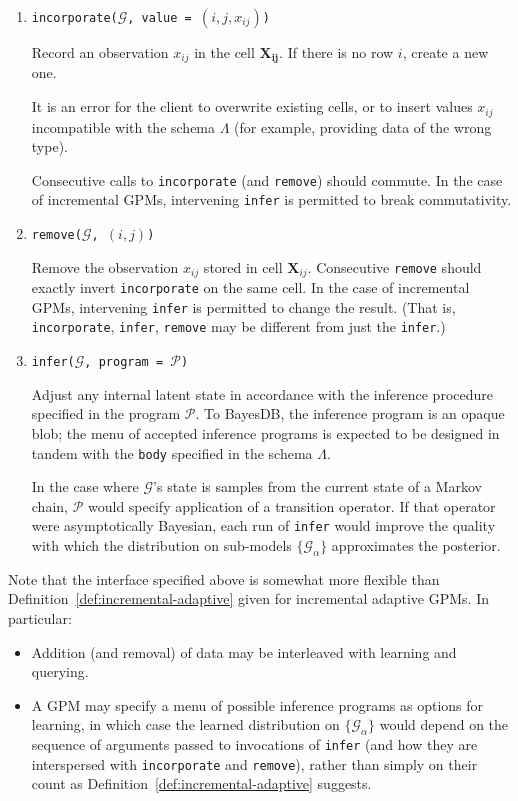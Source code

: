 \documentclass[10pt,letterpaper]{article}
\newcommand{\G}{\mathcal{G}}
\begin{document}
\begin{enumerate}
\item \texttt{incorporate($\G$, value = $(i, j, x_{ij})$)}

    Record an observation $x_{ij}$ in the cell $\mathbf{X_{ij}}$.
    If there is no row $i$, create a new one.

    It is an error for the client to overwrite existing cells, or to insert values
    $x_{ij}$ incompatible with the schema $\Lambda$ (for example,
    providing data of the wrong type).

    Consecutive calls to \texttt{incorporate} (and \texttt{remove})
    should commute.  In the case of incremental GPMs, intervening
    \texttt{infer} is permitted to break commutativity.

\item \texttt{remove($\G$, $(i, j)$)}

    Remove the observation $x_{ij}$ stored in cell $\mathbf{X}_{ij}$.
    Consecutive \texttt{remove} should exactly invert
    \texttt{incorporate} on the same cell.  In the case of incremental
    GPMs, intervening \texttt{infer} is permitted to change the
    result.  (That is, \texttt{incorporate}, \texttt{infer}, \texttt{remove}
    may be different from just the \texttt{infer}.)

\item \texttt{infer($\G$, program = $\mathcal{P}$)}

    Adjust any internal latent state in accordance with the inference
    procedure specified in the program $\mathcal{P}$.  To BayesDB, the
    inference program is an opaque blob; the menu of accepted
    inference programs is expected to be designed in tandem with the
    \texttt{body} specified in the schema $\Lambda$.

    In the case where $\G$'s state is samples from the current state
    of a Markov chain, $\mathcal{P}$ would specify application of a
    transition operator.  If that operator were asymptotically
    Bayesian, each run of \texttt{infer} would improve the quality
    with which the distribution on sub-models $\{\G_\alpha\}$
    approximates the posterior.
\end{enumerate}

Note that the interface specified above is somewhat more flexible than
Definition~\ref{def:incremental-adaptive} given for incremental
adaptive GPMs.  In particular:

\begin{itemize}
\item Addition (and removal) of data may be interleaved with learning
  and querying.
\item A GPM may specify a menu of possible inference programs as
  options for learning, in which case the learned distribution on
  $\{\G_\alpha\}$ would depend on the sequence of arguments passed to invocations
  of \texttt{infer} (and how they are interspersed with
  \texttt{incorporate} and \texttt{remove}), rather than simply on
  their count as Definition~\ref{def:incremental-adaptive} suggests.
\end{itemize}
\end{document}
